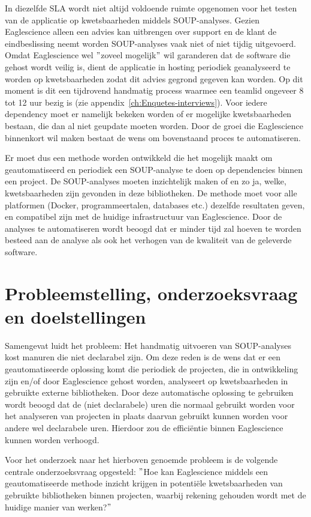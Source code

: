 In diezelfde SLA wordt niet altijd voldoende ruimte opgenomen voor het testen van de applicatie op kwetsbaarheden middels SOUP-analyses. Gezien Eaglescience alleen een advies kan uitbrengen over support en de klant de eindbeslissing neemt worden SOUP-analyses vaak niet of niet tijdig uitgevoerd. Omdat Eaglescience wel $"$zoveel mogelijk$"$ wil garanderen dat de software die gehost wordt veilig is, dient de applicatie in hosting periodiek geanalyseerd te worden op kwetsbaarheden zodat dit advies gegrond gegeven kan worden. Op dit moment is dit een tijdrovend handmatig process waarmee een teamlid ongeveer 8 tot 12 uur bezig is (zie appendix~\ref{ch:Enquetes-interviews}). Voor iedere dependency moet er namelijk bekeken worden of er mogelijke kwetsbaarheden bestaan, die dan al niet geupdate moeten worden. Door de groei die Eaglescience binnenkort wil maken bestaat de wens om bovenstaand proces te automatiseren.

Er moet dus een methode worden ontwikkeld die het mogelijk maakt om geautomatiseerd en periodiek een SOUP-analyse te doen op dependencies binnen een project. De SOUP-analyses moeten inzichtelijk maken of en zo ja, welke, kwetsbaarheden zijn gevonden in deze bibliotheken. De methode moet voor alle platformen (Docker, programmeertalen, databases etc.) dezelfde resultaten geven, en compatibel zijn met de huidige infrastructuur van Eaglescience. Door de analyses te automatiseren wordt beoogd dat er minder tijd zal hoeven te worden besteed aan de analyse als ook het verhogen van de kwaliteit van de geleverde software.

\section{Probleemstelling, onderzoeksvraag en doelstellingen}\label{sec:probleem-stelling-onderzoeksvraag-en-doelstellingen}
Samengevat luidt het probleem: Het handmatig uitvoeren van SOUP-analyses kost manuren die niet declarabel zijn.
Om deze reden is de wens dat er een geautomatiseerde oplossing komt die periodiek de projecten, die in ontwikkeling zijn en/of door Eaglescience gehost worden, analyseert op kwetsbaarheden in gebruikte externe bibliotheken. Door deze automatische oplossing te gebruiken wordt beoogd dat de (niet declarabele) uren die normaal gebruikt worden voor het analyseren van projecten in plaats daarvan gebruikt kunnen worden voor andere wel declarabele uren. Hierdoor zou de efficiëntie binnen Eaglescience kunnen worden verhoogd.

Voor het onderzoek naar het hierboven genoemde probleem is de volgende centrale onderzoeksvraag opgesteld: $"$Hoe kan Eaglescience middels een geautomatiseerde methode inzicht krijgen in potentiële kwetsbaarheden van gebruikte bibliotheken binnen projecten, waarbij rekening gehouden wordt met de huidige manier van werken?$"$


